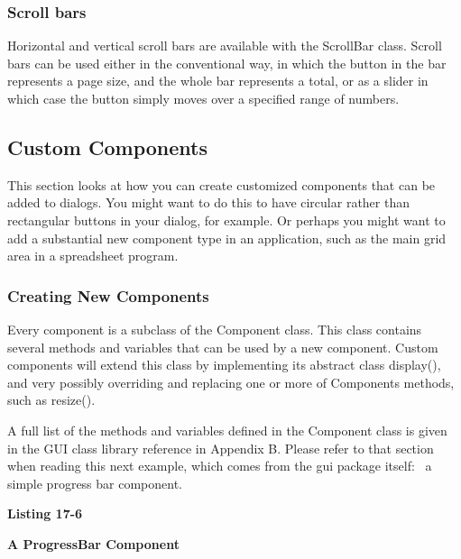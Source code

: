 \subsubsection{Scroll bars}

Horizontal and vertical scroll bars are available with the
\textsf{ScrollBar} class. Scroll bars can be used either in the
conventional way, in which the button in the bar represents a page
size, and the whole bar represents a total, or as a slider in which
case the button simply moves over a specified range of numbers.

\subsection{Custom Components}

This section looks at how you can create customized components that can
be added to dialogs. You might want to do this to have circular rather
than rectangular buttons in your dialog, for example. Or perhaps you
might want to add a substantial new component type in an application,
such as the main grid area in a spreadsheet program.

\subsubsection{Creating New Components}

Every component is a subclass of the \textsf{Component}
class. This class contains several methods and variables that can be
used by a new component. Custom components will extend this class by
implementing its abstract class \textsf{display()}, and very possibly
overriding and replacing one or more of
\textsf{Component}{\textquotesingle}s methods, such as
\textsf{resize()}.

A full list of the methods and variables defined in the
\textsf{Component} class is given in the GUI class library reference in
Appendix B. Please refer to that section when reading this next
example, which comes from the \textsf{gui} package itself: \ a simple
{\textquotedbl}progress bar{\textquotedbl} component.

{\sffamily\bfseries
Listing 17-6}

{\sffamily\bfseries
A ProgressBar Component}

